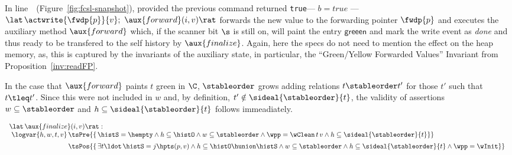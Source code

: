 
In line~\lineWrtFwd~(Figure~\ref{fig:fcsl-snapshot}), provided the
previous command returned {\tt true}--- \ie $b = true$ ---
$ \lat\, \actwrite{\fwdp{p}}{v};\ \aux{forward}(i,v)\rat $ forwards
the new value to the forwarding pointer $\fwdp{p}$ and executes the
auxiliary method $\aux{forward}$ which, if the scanner bit $\s$ is
still on, will paint the entry $\mathsf{greeen}$ and mark the write
event as {\it done} and thus ready to be transfered to the self
history by $\aux{finalize}$. Again, here the specs do not need to
mention the effect on the heap memory, as, this is captured by the
invariants of the auxiliary state, in particular, the ``Green/Yellow
Forwarded Values'' Invariant from Proposition~\ref{inv:readFP}.

In the case that $\aux{forward}$ paints $t$ green in $\C$,
$\stableorder$ grows adding relations $ t \stableorder t'$ for those
$t'$ such that $ t \tleq t'$. Since this were not included in $w$ and,
by definition, $ t' \notin \sideal{\stableorder}{t}$, the validity of
assertions $ w \subseteq \stableorder $ and $
h \subseteq \sideal{\stableorder}{t}$ follows immeadiately.


\[
\begin{array}{l}
\lat\,\aux{finalize}(i,v)\rat :\\
~\logvar{h,w,t,v}\
\!\!\!\!\begin{array}[t]{l}
\tsPre{\{\, \histS = \hempty \wedge h \subseteq \histO \wedge
             w \subseteq \stableorder \wedge \wpp = \wClean\, t\, v \wedge
             h \subseteq \sideal{\stableorder}{t}\}}\ \\[5pt]
 \tsPos{\{\, \exists t\ldot\, \histS = j \hpts (p,v) \wedge
            h \subseteq \histO \hunion \histS \wedge
            w \subseteq \stableorder \wedge
            h \subseteq \sideal{\stableorder}{t} \wedge \wpp = \wInit\}}
\end{array}
\end{array}
\]

